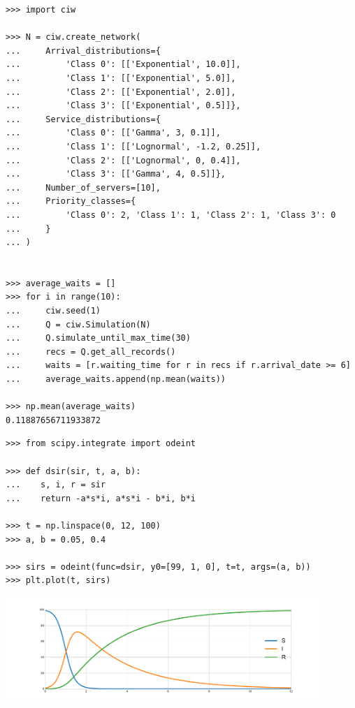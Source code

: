 \documentclass{beamer}
\begin{document}
\begin{frame}[fragile]
\tiny{
\begin{verbatim}
>>> import ciw

>>> N = ciw.create_network(
...     Arrival_distributions={
...         'Class 0': [['Exponential', 10.0]],
...         'Class 1': [['Exponential', 5.0]],
...         'Class 2': [['Exponential', 2.0]],
...         'Class 3': [['Exponential', 0.5]]},
...     Service_distributions={
...         'Class 0': [['Gamma', 3, 0.1]],
...         'Class 1': [['Lognormal', -1.2, 0.25]],
...         'Class 2': [['Lognormal', 0, 0.4]],
...         'Class 3': [['Gamma', 4, 0.5]]},
...     Number_of_servers=[10],
...     Priority_classes={
...         'Class 0': 2, 'Class 1': 1, 'Class 2': 1, 'Class 3': 0
...     }
... )


>>> average_waits = []
>>> for i in range(10):
...     ciw.seed(1)
...     Q = ciw.Simulation(N)
...     Q.simulate_until_max_time(30)
...     recs = Q.get_all_records()
...     waits = [r.waiting_time for r in recs if r.arrival_date >= 6]
...     average_waits.append(np.mean(waits))

>>> np.mean(average_waits)
0.11887656711933872
\end{verbatim}
}
\end{frame}


\begin{frame}[fragile]
\scriptsize{
\begin{verbatim}
>>> from scipy.integrate import odeint

>>> def dsir(sir, t, a, b):
...    s, i, r = sir
...    return -a*s*i, a*s*i - b*i, b*i

>>> t = np.linspace(0, 12, 100)
>>> a, b = 0.05, 0.4

>>> sirs = odeint(func=dsir, y0=[99, 1, 0], t=t, args=(a, b))
>>> plt.plot(t, sirs)
\end{verbatim}
}
\begin{center}
  \includegraphics[width=0.9\textwidth]{SIR}
\end{center}
\end{frame}
\end{document}
